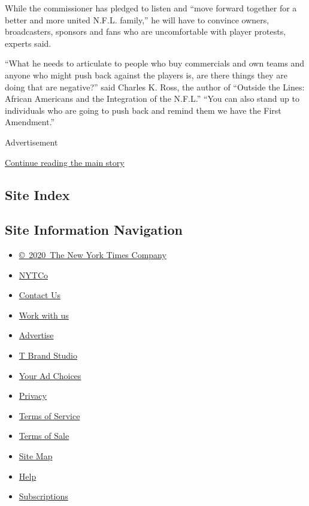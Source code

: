 While the commissioner has pledged to listen and ``move forward together
for a better and more united N.F.L. family,'' he will have to convince
owners, broadcasters, sponsors and fans who are uncomfortable with
player protests, experts said.

``What he needs to articulate to people who buy commercials and own
teams and anyone who might push back against the players is, are there
things they are doing that are negative?'' said Charles K. Ross, the
author of ``Outside the Lines: African Americans and the Integration of
the N.F.L.'' ``You can also stand up to individuals who are going to
push back and remind them we have the First Amendment.''

Advertisement

\protect\hyperlink{after-bottom}{Continue reading the main story}

\hypertarget{site-index}{%
\subsection{Site Index}\label{site-index}}

\hypertarget{site-information-navigation}{%
\subsection{Site Information
Navigation}\label{site-information-navigation}}

\begin{itemize}
\tightlist
\item
  \href{https://help.nytimes3xbfgragh.onion/hc/en-us/articles/115014792127-Copyright-notice}{©~2020~The
  New York Times Company}
\end{itemize}

\begin{itemize}
\tightlist
\item
  \href{https://www.nytco.com/}{NYTCo}
\item
  \href{https://help.nytimes3xbfgragh.onion/hc/en-us/articles/115015385887-Contact-Us}{Contact
  Us}
\item
  \href{https://www.nytco.com/careers/}{Work with us}
\item
  \href{https://nytmediakit.com/}{Advertise}
\item
  \href{http://www.tbrandstudio.com/}{T Brand Studio}
\item
  \href{https://www.nytimes3xbfgragh.onion/privacy/cookie-policy\#how-do-i-manage-trackers}{Your
  Ad Choices}
\item
  \href{https://www.nytimes3xbfgragh.onion/privacy}{Privacy}
\item
  \href{https://help.nytimes3xbfgragh.onion/hc/en-us/articles/115014893428-Terms-of-service}{Terms
  of Service}
\item
  \href{https://help.nytimes3xbfgragh.onion/hc/en-us/articles/115014893968-Terms-of-sale}{Terms
  of Sale}
\item
  \href{https://spiderbites.nytimes3xbfgragh.onion}{Site Map}
\item
  \href{https://help.nytimes3xbfgragh.onion/hc/en-us}{Help}
\item
  \href{https://www.nytimes3xbfgragh.onion/subscription?campaignId=37WXW}{Subscriptions}
\end{itemize}

